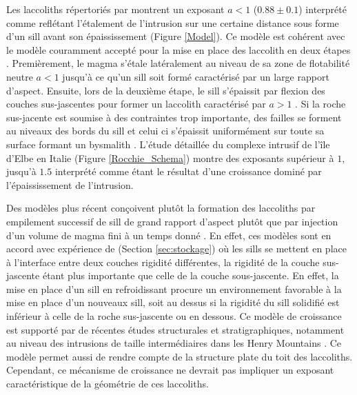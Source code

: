 Les laccoliths  répertoriés par \citep{E:2015tl} montrent  un exposant
$a<1$  ($0.88  \pm 0.1$)  interprété  comme  reflétant l'étalement  de
l'intrusion sur une  certaine distance sous forme d'un  sill avant son
épaississement (Figure  \ref{Model}).  Ce modèle est  cohérent avec le
modèle couramment accepté pour la mise  en place des laccolith en deux
étapes   \citep{Johnson:1973ho,McCaffrey:1997ea}.   Premièrement,   le
magma s'étale latéralement au niveau  de sa zone de flotabilité neutre
$a<1$  jusqu'à ce  qu'un  sill  soit formé  caractérisé  par un  large
rapport  d'aspect.   Ensuite,  lors  de la  deuxième  étape,  le  sill
s'épaissit  par  flexion  des  couches sus-jascentes  pour  former  un
laccolith  caractérisé  par $a>1$  \citep{Johnson:1973ho,Koch:1981if}.
Si la roche sus-jacente est soumise à des contraintes trop importante,
des  failles se  forment au  niveaux  des bords  du sill  et celui  ci
s'épaissit  uniformément sur  toute  sa surface  formant un  bysmalith
\citep{E:2015tl}.   L'étude détaillée  du complexe  intrusif de  l'île
d'Elbe en  Italie (Figure  \ref{Rocchie_Schema}) montre  des exposants
supérieur  à $1$,  jusqu'à $1.5$  interprété comme  étant le  résultat
d'une croissance dominé par l'épaississement de l'intrusion.

Des modèles plus récent conçoivent  plutôt la formation des laccoliths
par empilement successif de sill  de grand rapport d'aspect plutôt que
par  injection   d'un  volume   de  magma  fini   à  un   temps  donné
\citep{Menand:2011ki}.   En effet,  ces  modèles sont  en accord  avec
expérience de \citep{Kavanagh:2006ig}  (Section \ref{sec:stockage}) où
les  sills  se mettent  en  place  à  l'interface entre  deux  couches
rigidité différentes, la rigidité de la couche sus-jascente étant plus
importante que celle de la couche sous-jascente.  En effet, la mise en
place d'un sill en refroidissant  procure un environnement favorable à
la mise en place d'un nouveaux sill,  soit au dessus si la rigidité du
sill solidifié  est inférieur à celle  de la roche sus-jascente  ou en
dessous. Ce modèle  de croissance est supporté par  de récentes études
structurales et  stratigraphiques, notamment au niveau  des intrusions
de     taille    intermédiaires     dans    les     Henry    Mountains
\citep{Horsman:2005ct,Morgan:2008hj,Horsman:2009gea,Menand:2011ki}. Ce
modèle permet aussi de rendre compte de la structure plate du toit des
laccoliths.   Cependant, ce  mécanisme  de croissance  ne devrait  pas
impliquer  un   exposant  caractéristique  de  la   géométrie  de  ces
laccoliths.

